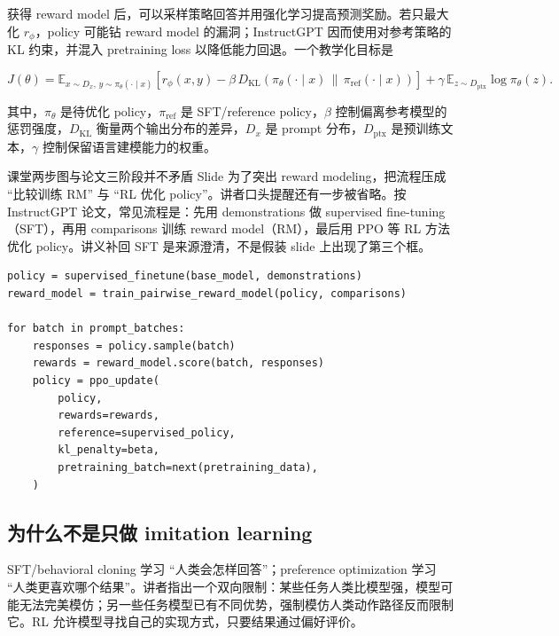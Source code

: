 获得 reward model 后，可以采样策略回答并用强化学习提高预测奖励。若只最大化 $r_\phi$，policy 可能钻 reward model 的漏洞；InstructGPT 因而使用对参考策略的 KL 约束，并混入 pretraining loss 以降低能力回退。一个教学化目标是

\[
J(\theta)=
\mathbb{E}_{x\sim D_x,\,y\sim\pi_\theta(\cdot\mid x)}
\left[r_\phi(x,y)-\beta\,
D_{\mathrm{KL}}\!\left(\pi_\theta(\cdot\mid x)\,\|\,\pi_{\mathrm{ref}}(\cdot\mid x)\right)\right]
+\gamma\,\mathbb{E}_{z\sim D_{\mathrm{ptx}}}\log \pi_\theta(z).
\]

其中，$\pi_\theta$ 是待优化 policy，$\pi_{\mathrm{ref}}$ 是 SFT/reference policy，$\beta$ 控制偏离参考模型的惩罚强度，$D_{\mathrm{KL}}$ 衡量两个输出分布的差异，$D_x$ 是 prompt 分布，$D_{\mathrm{ptx}}$ 是预训练文本，$\gamma$ 控制保留语言建模能力的权重。


\begin{importantbox}{课堂两步图与论文三阶段并不矛盾}
Slide 为了突出 reward modeling，把流程压成 ``比较训练 RM'' 与 ``RL 优化 policy''。讲者口头提醒还有一步被省略。按 InstructGPT 论文，常见流程是：先用 demonstrations 做 supervised fine-tuning（SFT），再用 comparisons 训练 reward model（RM），最后用 PPO 等 RL 方法优化 policy。讲义补回 SFT 是来源澄清，不是假装 slide 上出现了第三个框。
\end{importantbox}

\begin{lstlisting}[caption={RLHF 三阶段的最小伪代码}]
policy = supervised_finetune(base_model, demonstrations)
reward_model = train_pairwise_reward_model(policy, comparisons)

for batch in prompt_batches:
    responses = policy.sample(batch)
    rewards = reward_model.score(batch, responses)
    policy = ppo_update(
        policy,
        rewards=rewards,
        reference=supervised_policy,
        kl_penalty=beta,
        pretraining_batch=next(pretraining_data),
    )
\end{lstlisting}

\subsection{为什么不是只做 imitation learning}

SFT/behavioral cloning 学习 ``人类会怎样回答''；preference optimization 学习 ``人类更喜欢哪个结果''。讲者指出一个双向限制：某些任务人类比模型强，模型可能无法完美模仿；另一些任务模型已有不同优势，强制模仿人类动作路径反而限制它。RL 允许模型寻找自己的实现方式，只要结果通过偏好评价。

